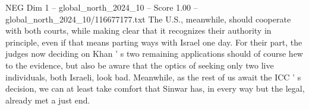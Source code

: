 \begin{textsample}{NEG Dim 1 – global\_north\_2024\_10 – Score 1.00 – global\_north\_2024\_10/116677177.txt}
The U.S., meanwhile, should cooperate with both courts, while making clear that it recognizes their authority in principle, even if that means parting ways with Israel one day.
For their part, the judges now deciding on Khan ' s two remaining applications should of course hew to the evidence, but also be aware that the optics of seeking only two live individuals, both Israeli, look bad.
Meanwhile, as the rest of us await the ICC ' s decision, we can at least take comfort that Sinwar has, in every way but the legal, already met a just end.

\end{textsample}
